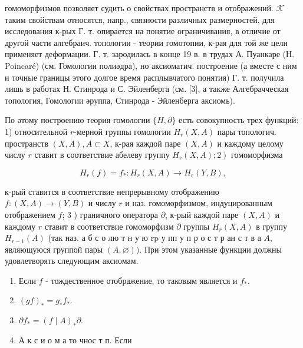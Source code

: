 \documentclass[10pt]{article}
\begin{document}
гомоморфизмов позволяет судить о свойствах пространств и отображений. $\mathcal{K}$ таким свойствам относятся, напр., связности различных размерностей, для исследования к-рых Г. т. опирается на понятие ограничивания, в отличие от другой части алгебраич. топологии - теории гомотопии, к-рая для той же цели применяет деформации. Г. т. зародилась в конце 19 в. в трудах А. Пуанкаре (Н. Poincaré) (см. Гомологии полиәдра), но аксиоматич. построение (а вместе с ним и точные границы этого долгое время расплывчатого понятия) Г. т. получила лишь в работах Н. Стинрода и С. Эйленберга (см. [3], а также Алгебрачческая топология, Гомологии әруппа, Стинрода - Эйленберга аксиомь).



По әтому построению теория гомологии $\{H, \partial\}$ есть совокупность трех функций: 1) относительной $r$-мерной группы гомологии $H_{r}(X, A)$ пары топологич. пространств $(X, A), A \subset X$, к-рая каждой паре $(X, A)$ и каждому целому числу $r$ ставит в соответствие абелеву группу $\left.H_{r}(X, A) ; 2\right)$ гомоморфизма



\[

H_{r}(f)=f_{*}: H_{r}(X, A) \longrightarrow H_{r}(Y, B),

\]



к-рый ставится в соответствие непрерывному отображению $f:(X, A) \rightarrow(Y, B)$ и числу $r$ и наз. гомоморфизмом, индуцированным отображением $f$; 3 ) граничного оператора $\partial$, к-рый каждой паре $(X, A)$ и каждому $r$ ставит в соответствие гомоморфизм $\partial$ группы $H_{r}(X, A)$ в группу $H_{r-1}(A)$ (так наз. а б с о лю т н у ю $\mathrm{r} \mathrm{p}$ у пп у п р о с т р ан с т в а $A$, являющуюся группой пары $(A, \varnothing))$. При этом указанные функции должны удовлетворять следующим аксиомам.



\begin{enumerate}

  \item Если $f$ - тождественное отображение, то таковым является и $f_{*}$.



  \item $(g f)_{*}=g_{*} f_{*}$.



  \item $\partial f_{*}=(f \mid A)_{*} \partial$.



  \item А к с и о м а то чнос т п. Если



\end{enumerate}
\end{document}
